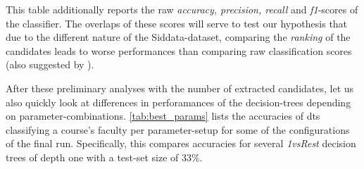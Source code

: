 This table additionally reports the raw \textit{accuracy, precision, recall} and \textit{f1}-scores of the classifier. The overlaps of these scores will  serve to test our hypothesis that due to the different nature of the Siddata-dataset, comparing the \textit{ranking} of the candidates leads to worse performances than comparing raw classification scores (also suggested by \cite{Ager2018}).

After these preliminary analyses with the number of extracted candidates, let us also quickly look at differences in perforamances of the decision-trees depending on parameter-combinations. \autoref{tab:best_params} lists the accuracies of \glspl{dt} classifying a course's faculty per parameter-setup for some of the configurations of the final run. Specifically, this compares accuracies for several \textit{1vsRest} decision trees of depth one with a test-set size of 33\%.


\newcommand{\SmfauhcsdT}{\setlength\extrarowheight{-5pt} \scriptsize \mfauhcsdT}
\newcommand{\Smfauhtcsldp}{\setlength\extrarowheight{-5pt} \scriptsize \mfauhtcsldp}

